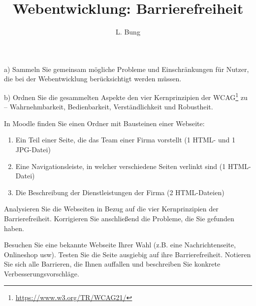 \documentclass[11pt, a4paper]{article}
\begin{document}
	\author{L. Bung}
	\title{Webentwicklung: \hspace{10cm}Barrierefreiheit}
	\subject{SAE}
	\maketitle
	
	
	a) Sammeln Sie gemeinsam mögliche Probleme und Einschränkungen für Nutzer, die bei der Webentwicklung berücksichtigt werden müssen.
	
	\lines[4cm]
	
	b) Ordnen Sie die gesammelten Aspekte den vier Kernprinzipien der WCAG\footnote{\url{https://www.w3.org/TR/WCAG21/}} zu -- Wahrnehmbarkeit, Bedienbarkeit, Verständlichkeit und Robustheit.
	
	\boxarea[10cm]
	
	
	
	In Moodle finden Sie einen Ordner mit Bausteinen einer Webseite:
	
	\begin{enumerate}
		\item Ein Teil einer Seite, die das Team einer Firma vorstellt (1 HTML- und 1 JPG-Datei)
		\item Eine Navigationsleiste, in welcher verschiedene Seiten verlinkt sind (1 HTML-Datei)
		\item Die Beschreibung der Dienstleistungen der Firma (2 HTML-Dateien)
	\end{enumerate}

	Analysieren Sie die Webseiten in Bezug auf die vier Kernprinzipien der Barrierefreiheit.
	Korrigieren Sie anschließend die Probleme, die Sie gefunden haben.
	
	
	Besuchen Sie eine bekannte Webseite Ihrer Wahl (z.B. eine Nachrichtenseite, Onlineshop usw).
	Testen Sie die Seite ausgiebig auf ihre Barrierefreiheit.
	Notieren Sie sich alle Barrieren, die Ihnen auffallen und beschreiben Sie konkrete Verbesserungsvorschläge.
	
	\lines[4cm]
\end{document}

